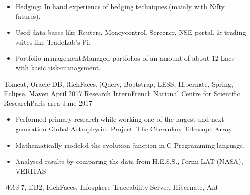 \begin{experiences}
{\begin{itemize}
                        \item Hedging: In hand experience of hedging techniques (mainly with Nifty futures).               
                        \item Used data bases like Reuters, Moneycontrol, Screener, NSE portal, \& trading suites like TradeLab's Pi.                          
                        \item Portfolio management:Managed portfolios of an amount of about 12 Lacs with basic risk-management.
                      \end{itemize}
                    }
                    {Tomcat, Oracle DB, RichFaces, jQuery, Bootstrap, LESS, Hibernate, Spring, Eclipse, Maven}
 \emptySeparator
  \consultantexperience
  {April 2017}       {Research Intern}{French National Centre for Scientific Research}{Paris area}
  {June 2017}   {}{}
                    {
                      \begin{itemize}
                        \item Performed primary research while working one of the largest and next generation Global Astrophysics Project: The Cherenkov Telescope Array                             
                        \item Mathematically modeled the evolution function in C Programming language.         
                        \item Analysed results by comparing the data from H.E.S.S., Fermi-LAT (NASA), VERITAS                  
                      \end{itemize}
                    }
                    {\emph{WAS} 7, DB2, RichFaces, Infosphere Traceability Server, Hibernate, Ant}
  \emptySeparator
\end{experiences}
